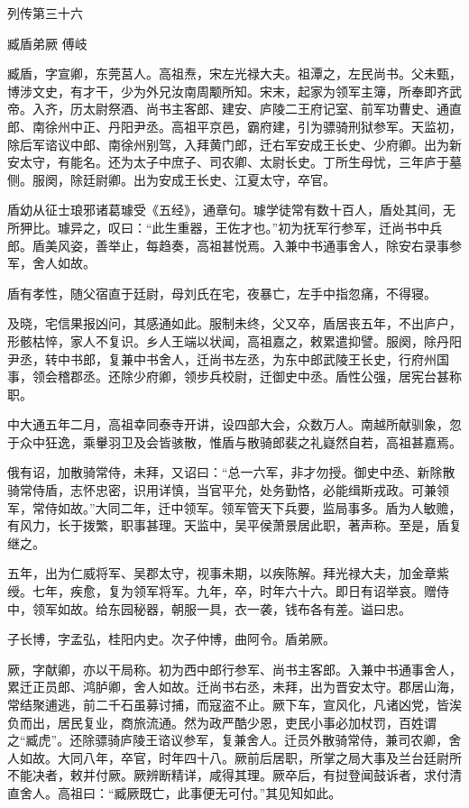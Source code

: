 \documentclass[12pt,UTF8]{ctexbook}
\begin{document}
列传第三十六

臧盾弟厥 傅岐

臧盾，字宣卿，东莞莒人。高祖焘，宋左光禄大夫。祖潭之，左民尚书。父未甄，博涉文史，有才干，少为外兄汝南周颙所知。宋末，起家为领军主簿，所奉即齐武帝。入齐，历太尉祭酒、尚书主客郎、建安、庐陵二王府记室、前军功曹史、通直郎、南徐州中正、丹阳尹丞。高祖平京邑，霸府建，引为骠骑刑狱参军。天监初，除后军谘议中郎、南徐州别驾，入拜黄门郎，迁右军安成王长史、少府卿。出为新安太守，有能名。还为太子中庶子、司农卿、太尉长史。丁所生母忧，三年庐于墓侧。服阕，除廷尉卿。出为安成王长史、江夏太守，卒官。

盾幼从征士琅邪诸葛璩受《五经》，通章句。璩学徒常有数十百人，盾处其间，无所狎比。璩异之，叹曰：“此生重器，王佐才也。”初为抚军行参军，迁尚书中兵郎。盾美风姿，善举止，每趋奏，高祖甚悦焉。入兼中书通事舍人，除安右录事参军，舍人如故。

盾有孝性，随父宿直于廷尉，母刘氏在宅，夜暴亡，左手中指忽痛，不得寝。

及晓，宅信果报凶问，其感通如此。服制未终，父又卒，盾居丧五年，不出庐户，形骸枯悴，家人不复识。乡人王端以状闻，高祖嘉之，敕累遣抑譬。服阕，除丹阳尹丞，转中书郎，复兼中书舍人，迁尚书左丞，为东中郎武陵王长史，行府州国事，领会稽郡丞。还除少府卿，领步兵校尉，迁御史中丞。盾性公强，居宪台甚称职。

中大通五年二月，高祖幸同泰寺开讲，设四部大会，众数万人。南越所献驯象，忽于众中狂逸，乘轝羽卫及会皆骇散，惟盾与散骑郎裴之礼嶷然自若，高祖甚嘉焉。

俄有诏，加散骑常侍，未拜，又诏曰：“总一六军，非才勿授。御史中丞、新除散骑常侍盾，志怀忠密，识用详慎，当官平允，处务勤恪，必能缉斯戎政。可兼领军，常侍如故。”大同二年，迁中领军。领军管天下兵要，监局事多。盾为人敏赡，有风力，长于拨繁，职事甚理。天监中，吴平侯萧景居此职，著声称。至是，盾复继之。

五年，出为仁威将军、吴郡太守，视事未期，以疾陈解。拜光禄大夫，加金章紫绶。七年，疾愈，复为领军将军。九年，卒，时年六十六。即日有诏举哀。赠侍中，领军如故。给东园秘器，朝服一具，衣一袭，钱布各有差。谥曰忠。

子长博，字孟弘，桂阳内史。次子仲博，曲阿令。盾弟厥。

厥，字献卿，亦以干局称。初为西中郎行参军、尚书主客郎。入兼中书通事舍人，累迁正员郎、鸿胪卿，舍人如故。迁尚书右丞，未拜，出为晋安太守。郡居山海，常结聚逋逃，前二千石虽募讨捕，而寇盗不止。厥下车，宣风化，凡诸凶党，皆涘负而出，居民复业，商旅流通。然为政严酷少恩，吏民小事必加杖罚，百姓谓之“臧虎”。还除骠骑庐陵王谘议参军，复兼舍人。迁员外散骑常侍，兼司农卿，舍人如故。大同八年，卒官，时年四十八。厥前后居职，所掌之局大事及兰台廷尉所不能决者，敕并付厥。厥辨断精详，咸得其理。厥卒后，有挝登闻鼓诉者，求付清直舍人。高祖曰：“臧厥既亡，此事便无可付。”其见知如此。
\end{document}
